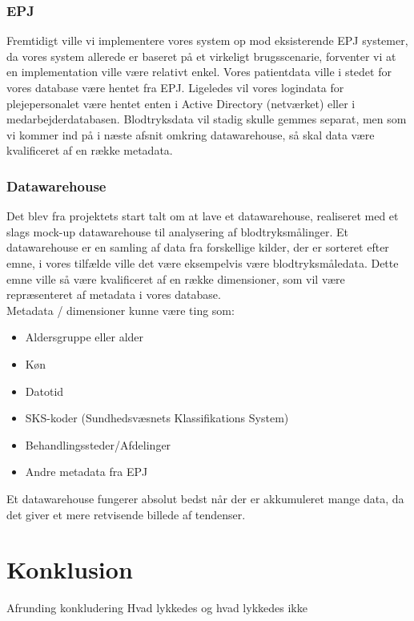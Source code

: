 \subsection{EPJ}
Fremtidigt ville vi implementere vores system op mod eksisterende EPJ systemer, da vores system allerede er baseret på et virkeligt brugsscenarie, forventer vi at en implementation ville være relativt enkel. Vores patientdata ville i stedet for vores database være hentet fra EPJ.  Ligeledes vil vores logindata for plejepersonalet være hentet enten i Active Directory (netværket) eller i medarbejderdatabasen. Blodtryksdata vil stadig skulle gemmes separat, men som vi kommer ind på i næste afsnit omkring datawarehouse, så skal data være kvalificeret af en række metadata.
\subsection{Datawarehouse}
Det blev fra projektets start talt om at lave et datawarehouse, realiseret med et slags mock-up datawarehouse til analysering af blodtryksmålinger. Et datawarehouse er en samling af data fra forskellige kilder, der er sorteret efter emne, i vores tilfælde ville det være eksempelvis være blodtryksmåledata. Dette emne ville så være kvalificeret af en række dimensioner, som vil være repræsenteret af metadata i vores database.\\ 
Metadata / dimensioner kunne være ting som:
\begin{itemize}
\item Aldersgruppe eller alder
\item Køn
\item Datotid
\item SKS-koder (Sundhedsvæsnets Klassifikations System)
\item Behandlingssteder/Afdelinger
\item Andre metadata fra EPJ
\end{itemize}
Et datawarehouse fungerer absolut bedst når der er akkumuleret mange data, da det giver et mere retvisende billede af tendenser. 
\chapter{Konklusion}
Afrunding
konkludering
Hvad lykkedes og hvad lykkedes ikke